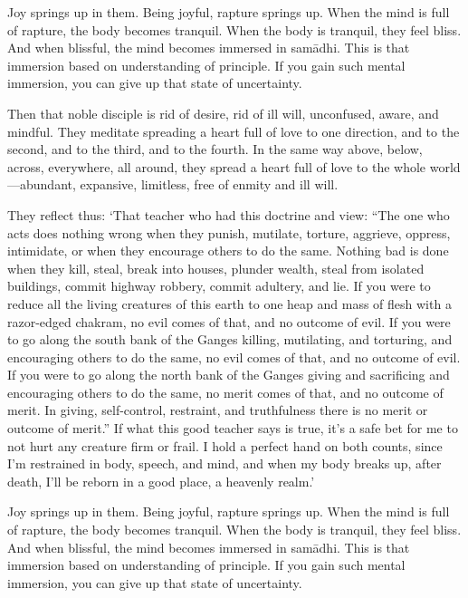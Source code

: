 \documentclass[12pt,openany]{book}%
\begin{document}
Joy springs up in them. Being joyful, rapture springs up. When the mind is full of rapture, the body becomes tranquil. When the body is tranquil, they feel bliss. And when blissful, the mind becomes immersed in \textsanskrit{samādhi}. This is that immersion based on understanding of principle. If you gain such mental immersion, you can give up that state of uncertainty. 

Then that noble disciple is rid of desire, rid of ill will, unconfused, aware, and mindful. They meditate spreading a heart full of love to one direction, and to the second, and to the third, and to the fourth. In the same way above, below, across, everywhere, all around, they spread a heart full of love to the whole world—abundant, expansive, limitless, free of enmity and ill will. 

They reflect thus: ‘That teacher who had this doctrine and view: “The one who acts does nothing wrong when they punish, mutilate, torture, aggrieve, oppress, intimidate, or when they encourage others to do the same. Nothing bad is done when they kill, steal, break into houses, plunder wealth, steal from isolated buildings, commit highway robbery, commit adultery, and lie. If you were to reduce all the living creatures of this earth to one heap and mass of flesh with a razor-edged chakram, no evil comes of that, and no outcome of evil. If you were to go along the south bank of the Ganges killing, mutilating, and torturing, and encouraging others to do the same, no evil comes of that, and no outcome of evil. If you were to go along the north bank of the Ganges giving and sacrificing and encouraging others to do the same, no merit comes of that, and no outcome of merit. In giving, self-control, restraint, and truthfulness there is no merit or outcome of merit.” If what this good teacher says is true, it’s a safe bet for me to not hurt any creature firm or frail. I hold a perfect hand on both counts, since I’m restrained in body, speech, and mind, and when my body breaks up, after death, I’ll be reborn in a good place, a heavenly realm.’ 

Joy springs up in them. Being joyful, rapture springs up. When the mind is full of rapture, the body becomes tranquil. When the body is tranquil, they feel bliss. And when blissful, the mind becomes immersed in \textsanskrit{samādhi}. This is that immersion based on understanding of principle. If you gain such mental immersion, you can give up that state of uncertainty. 
\end{document}
